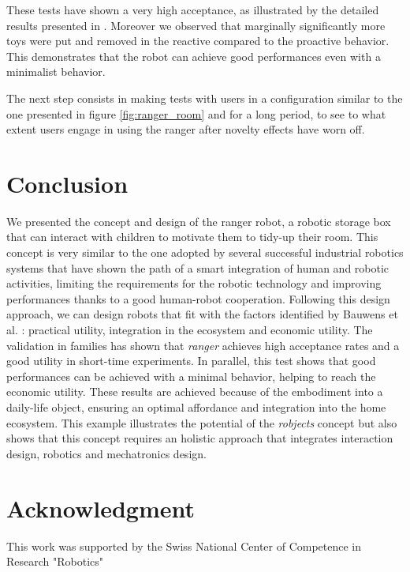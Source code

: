 \documentclass{sig-alternate}
\begin{document}
These tests have shown a very high acceptance, as illustrated by the detailed
results presented in \cite{Fink2014}.  Moreover we observed that marginally
significantly more toys were put and removed in the reactive compared to the
proactive behavior.  This demonstrates that the robot can achieve good
performances even with a minimalist behavior. 

The next step consists in making tests with users in a configuration similar to
the one presented in figure \ref{fig:ranger_room} and for a long period, to see
to what extent users engage in using the ranger after novelty effects have worn
off.



\section{Conclusion}

We presented the concept and design of the ranger robot, a robotic storage box
that can interact with children to motivate them to tidy-up their room.  This
concept is very similar to the one adopted by several successful industrial
robotics systems that have shown the path of a smart integration of human and
robotic activities, limiting the requirements for the robotic technology and
improving performances thanks to a good human-robot cooperation.  Following this
design approach, we can design robots that fit with the factors identified by
Bauwens et al. \cite{Bauwens2012}: practical utility, integration in the
ecosystem and economic utility.  The validation in families has shown that
\textit{ranger} achieves high acceptance rates and a good utility in short-time
experiments.  In parallel, this test shows that good performances can be
achieved with a minimal behavior, helping to reach the economic utility.  These
results are achieved because of the embodiment into a daily-life object,
ensuring an optimal affordance and integration into the home ecosystem.  This
example illustrates the potential of the \textit{robjects} concept but also
shows that this concept requires an holistic approach that integrates
interaction design, robotics and mechatronics design. 

\section*{Acknowledgment}

This work was supported by the Swiss National Center of Competence in Research
"Robotics"




\end{document}
